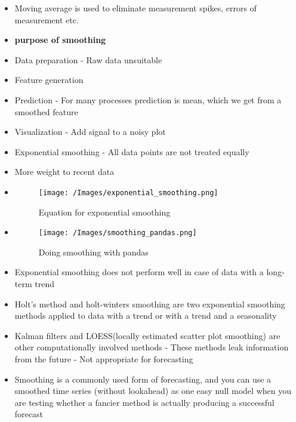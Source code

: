 \documentclass[
  letterpaper,
  DIV=11,
  numbers=noendperiod]{scrartcl}
\begin{document}
\begin{itemize}
\item
  Moving average is used to eliminate measurement spikes, errors of
  measurement etc.
\item
  \textbf{purpose of smoothing}
\item
  Data preparation - Raw data unsuitable
\item
  Feature generation
\item
  Prediction - For many processes prediction is mean, which we get from
  a smoothed feature
\item
  Visualization - Add signal to a noisy plot
\item
  Exponential smoothing - All data points are not treated equally
\item
  More weight to recent data
\item
  \begin{figure}

  {\centering \texttt{[image: /Images/exponential\_smoothing.png]}

  }

  \caption{Equation for exponential smoothing}

  \end{figure}
\item
  \begin{figure}

  {\centering \texttt{[image: /Images/smoothing\_pandas.png]}

  }

  \caption{Doing smoothing with pandas}

  \end{figure}
\item
  Exponential smoothing does not perform well in case of data with a
  long-term trend
\item
  Holt's method and holt-winters smoothing are two exponential smoothing
  methods applied to data with a trend or with a trend and a seasonality
\item
  Kalman filters and LOESS(locally estimated scatter plot smoothing) are
  other computationally involved methods - These methods leak
  information from the future - Not appropriate for forecasting
\item
  Smoothing is a commonly used form of forecasting, and you can use a
  smoothed time series (without lookahead) as one easy null model when
  you are testing whether a fancier method is actually producing a
  successful forecast
\end{itemize}
\end{document}
